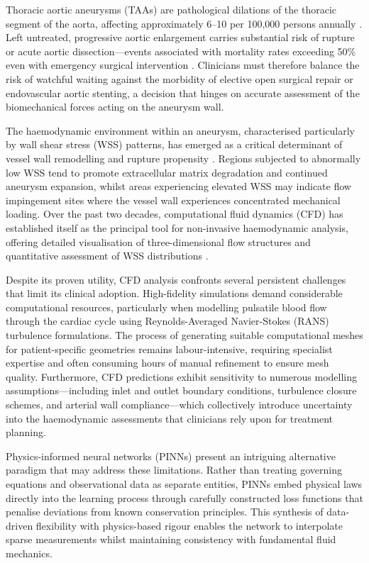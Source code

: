 \documentclass[11pt,a4paper]{article}
\begin{document}
Thoracic aortic aneurysms (TAAs) are pathological dilations of the thoracic segment of the aorta, affecting approximately 6--10 per 100,000 persons annually \cite{ref1}. Left untreated, progressive aortic enlargement carries substantial risk of rupture or acute aortic dissection---events associated with mortality rates exceeding 50\% even with emergency surgical intervention \cite{ref2}. Clinicians must therefore balance the risk of watchful waiting against the morbidity of elective open surgical repair or endovascular aortic stenting, a decision that hinges on accurate assessment of the biomechanical forces acting on the aneurysm wall.

The haemodynamic environment within an aneurysm, characterised particularly by wall shear stress (WSS) patterns, has emerged as a critical determinant of vessel wall remodelling and rupture propensity \cite{ref3,ref4}. Regions subjected to abnormally low WSS tend to promote extracellular matrix degradation and continued aneurysm expansion, whilst areas experiencing elevated WSS may indicate flow impingement sites where the vessel wall experiences concentrated mechanical loading. Over the past two decades, computational fluid dynamics (CFD) has established itself as the principal tool for non-invasive haemodynamic analysis, offering detailed visualisation of three-dimensional flow structures and quantitative assessment of WSS distributions \cite{ref5,ref6}.

Despite its proven utility, CFD analysis confronts several persistent challenges that limit its clinical adoption. High-fidelity simulations demand considerable computational resources, particularly when modelling pulsatile blood flow through the cardiac cycle using Reynolds-Averaged Navier-Stokes (RANS) turbulence formulations. The process of generating suitable computational meshes for patient-specific geometries remains labour-intensive, requiring specialist expertise and often consuming hours of manual refinement to ensure mesh quality. Furthermore, CFD predictions exhibit sensitivity to numerous modelling assumptions---including inlet and outlet boundary conditions, turbulence closure schemes, and arterial wall compliance---which collectively introduce uncertainty into the haemodynamic assessments that clinicians rely upon for treatment planning.

Physics-informed neural networks (PINNs) \cite{raissi2019pinns} present an intriguing alternative paradigm that may address these limitations. Rather than treating governing equations and observational data as separate entities, PINNs embed physical laws directly into the learning process through carefully constructed loss functions that penalise deviations from known conservation principles. This synthesis of data-driven flexibility with physics-based rigour enables the network to interpolate sparse measurements whilst maintaining consistency with fundamental fluid mechanics.
\end{document}
